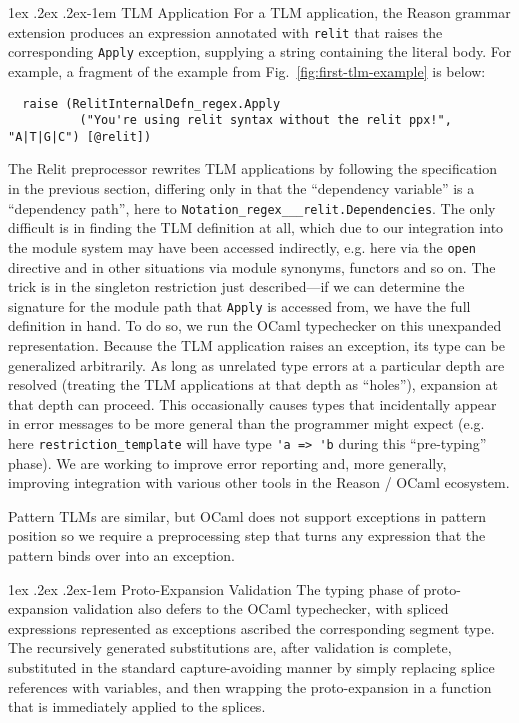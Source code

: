 \documentclass[acmsmall,screen]{acmart}
\makeatletter
\renewcommand{\paragraph}{%
  \@startsection{paragraph}{4}%
  {\z@}{1ex \@plus .2ex \@minus .2ex}{-1em}%
  {\normalfont\normalsize\bfseries}%
}
\newcommand{\li}[1]{\lstinline[basicstyle=\ttfamily\fontsize{9pt}{1em}\selectfont]{#1}}
\makeatother
\begin{document}
\paragraph{TLM Application} For a TLM application, the Reason grammar extension produces an expression annotated with \li{relit} that raises the corresponding \li{Apply} exception, supplying a string containing the literal body. For example, a fragment of the example from Fig.~\ref{fig:first-tlm-example} is below:
\begin{lstlisting}
  raise (RelitInternalDefn_regex.Apply
          ("You're using relit syntax without the relit ppx!", "A|T|G|C") [@relit])
\end{lstlisting}

The Relit preprocessor rewrites TLM applications by following the specification in the previous section, differing only in that the ``dependency variable'' is a ``dependency path'', here to \li{Notation_regex___relit.Dependencies}. The only difficult is in finding the TLM definition at all, which due to our integration into the module system may have been accessed indirectly, e.g. here via the \li{open} directive and in other situations via module synonyms, functors and so on. The trick is in the singleton restriction just described---if we can determine the signature for the module path that \li{Apply} is accessed from, we have the full definition in hand. To do so, we run the OCaml typechecker on this unexpanded representation. Because the TLM application raises an exception, its type can be generalized arbitrarily. As long as unrelated type errors at a particular depth are resolved (treating the TLM applications at that depth as ``holes''), expansion at that depth can proceed. This occasionally causes types that incidentally appear in error messages to be more general than the programmer might expect (e.g. here \li{restriction_template} will have type \li{'a => 'b} during this ``pre-typing'' phase). 
We are working to improve error reporting and, more generally, improving integration with various other tools in the Reason / OCaml ecosystem.

Pattern TLMs are similar, but OCaml does not support exceptions in pattern position so we require a preprocessing step that turns any expression that the pattern binds over into an exception.

\paragraph{Proto-Expansion Validation} The typing phase of proto-expansion validation also defers to the OCaml typechecker, with spliced expressions  represented as exceptions ascribed the corresponding segment type. The recursively generated substitutions are, after validation is complete, substituted in the standard capture-avoiding manner by simply replacing splice references with variables, and then wrapping the proto-expansion in a function that is immediately applied to the splices.
\end{document}
